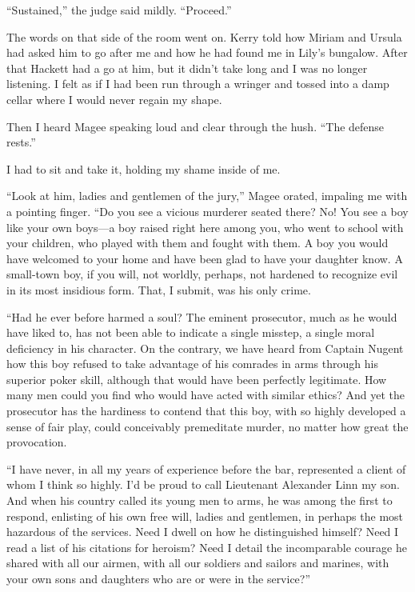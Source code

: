 \documentclass{novel}
\begin{document}
“Sustained,” the judge said mildly. “Proceed.”

The words on that side of the room went on. Kerry told how Miriam and Ursula had asked him to go after me and how he had found me in Lily’s bungalow. After that Hackett had a go at him, but it didn’t take long and I was no longer listening. I felt as if I had been run through a wringer and tossed into a damp cellar where I would never regain my shape.

Then I heard Magee speaking loud and clear through the hush. “The defense rests.”

\vspace{2\nbs}
\clearpage
\thispagestyle{empty}


\begin{ChapterStart}
\vspace{3\nbs}
\end{ChapterStart}

I had to sit and take it, holding my shame inside of me.

“Look at him, ladies and gentlemen of the jury,” Magee orated, impaling me with a pointing finger. “Do you see a vicious murderer seated there? No! You see a boy like your own boys—a boy raised right here among you, who went to school with your children, who played with them and fought with them. A boy you would have welcomed to your home and have been glad to have your daughter know. A small-town boy, if you will, not worldly, perhaps, not hardened to recognize evil in its most insidious form. That, I submit, was his only crime.

“Had he ever before harmed a soul? The eminent prosecutor, much as he would have liked to, has not been able to indicate a single misstep, a single moral deficiency in his character. On the contrary, we have heard from Captain Nugent how this boy refused to take advantage of his comrades in arms through his superior poker skill, although that would have been perfectly legitimate. How many men could you find who would have acted with similar ethics? And yet the prosecutor has the hardiness to contend that this boy, with so highly developed a sense of fair play, could conceivably premeditate murder, no matter how great the provocation.

“I have never, in all my years of experience before the bar, represented a client of whom I think so highly. I’d be proud to call Lieutenant Alexander Linn my son. And when his country called its young men to arms, he was among the first to respond, enlisting of his own free will, ladies and gentlemen, in perhaps the most hazardous of the services. Need I dwell on how he distinguished himself? Need I read a list of his citations for heroism? Need I detail the incomparable courage he shared with all our airmen, with all our soldiers and sailors and marines, with your own sons and daughters who are or were in the service?”
\end{document}
